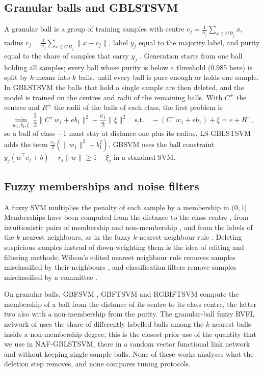 \documentclass[preprint,12pt]{elsarticle}
\newcommand{\NAF}{NAF-GBLSTSVM}
\begin{document}
\subsection{Granular balls and GBLSTSVM}

A granular ball is a group of training samples with centre $c_j=\frac{1}{n_j}\sum_{x\in GB_j}x$, radius $r_j=\frac{1}{n_j}\sum_{x\in GB_j}\lVert x-c_j\rVert$, label $y_j$ equal to the majority label, and purity equal to the share of samples that carry $y_j$ \cite{xia2019}. Generation starts from one ball holding all samples; every ball whose purity is below a threshold (0.985 here) is split by $k$-means into $k$ balls, until every ball is pure enough or holds one sample. In GBLSTSVM \cite{tanveer2024gblstsvm} the balls that hold a single sample are then deleted, and the model is trained on the centres and radii of the remaining balls. With $C^{\pm}$ the centres and $R^{\pm}$ the radii of the balls of each class, the first problem is
\begin{equation}
\min_{w_1,b_1,\xi}\ \frac{1}{2}\lVert C^{+}w_1+eb_1\rVert^{2}+\frac{c_1}{2}\lVert\xi\rVert^{2}
\quad\text{s.t.}\quad -(C^{-}w_1+eb_1)+\xi=e+R^{-} ,
\label{eq:gblstsvm}
\end{equation}
so a ball of class $-1$ must stay at distance one plus its radius. LS-GBLSTSVM adds the term $\frac{c_3}{2}(\lVert w_1\rVert^{2}+b_1^{2})$. GBSVM \cite{xia2022gbsvm} uses the ball constraint $y_j(w^{\top}c_j+b)-r_j\lVert w\rVert\ge 1-\xi_j$ in a standard SVM.

\subsection{Fuzzy memberships and noise filters}

A fuzzy SVM multiplies the penalty of each sample by a membership in $(0,1]$ \cite{lin2002}. Memberships have been computed from the distance to the class centre \cite{lin2002,batuwita2010}, from intuitionistic pairs of membership and non-membership \cite{rezvani2019}, and from the labels of the $k$ nearest neighbours, as in the fuzzy $k$-nearest-neighbour rule \cite{keller1985}. Deleting suspicious samples instead of down-weighting them is the idea of editing and filtering methods: Wilson's edited nearest neighbour rule removes samples misclassified by their neighbours \cite{wilson1972}, and classification filters remove samples misclassified by a committee \cite{brodley1999}.

On granular balls, GBFSVM \cite{xia2024gbfsvm}, GBFTSVM \cite{lang2025gbftsvm} and RGBIFTSVM \cite{liu2026rgbiftsvm} compute the membership of a ball from the distance of its centre to its class centre, the latter two also with a non-membership from the purity. The granular-ball fuzzy RVFL network of \cite{quadir2026gbfrvfl} uses the share of differently labelled balls among the $k$ nearest balls inside a non-membership degree; this is the closest prior use of the quantity that we use in \NAF{}, there in a random vector functional link network and without keeping single-sample balls. None of these works analyses what the deletion step removes, and none compares tuning protocols.
\end{document}
